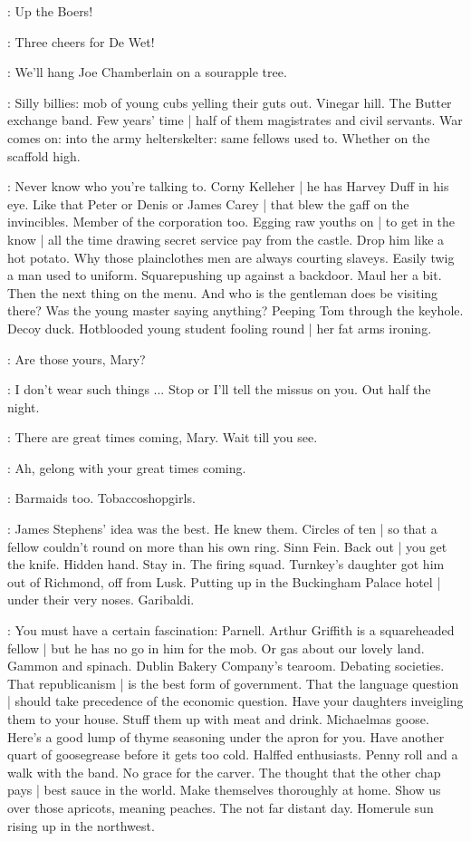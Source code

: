 :
Up the Boers!

:
Three cheers for De Wet!

:
We'll hang Joe Chamberlain on a sourapple tree.

\BloomInt:
Silly billies:
mob of young cubs yelling their guts out.
Vinegar hill.
The Butter exchange band.
Few years' time |
half of them magistrates and civil servants.
War comes on:
into the army helterskelter:
same fellows used to.
Whether on the scaffold high.

\BloomInt:
Never know who you're talking to.
Corny Kelleher |
he has Harvey Duff in his eye.
Like that Peter or Denis or James Carey |
that blew the gaff on the invincibles.
Member of the corporation too.
Egging raw youths on |
to get in the know |
all the time drawing secret service pay from the castle.
Drop him like a hot potato.
Why those plainclothes men are always courting slaveys.
Easily twig a man used to uniform.
Squarepushing up
against a backdoor.
Maul her a bit.
Then the next thing on the menu.
And who is the gentleman does be visiting there?
Was the young master saying anything?
Peeping Tom through the keyhole.
Decoy duck.
Hotblooded young student fooling round |
her fat arms ironing.

\policeman:
Are those yours,
Mary?

\mary:
I don't wear such things ...
Stop or I'll tell the missus on you.
Out half the night.

\policeman:
There are great times coming,
Mary.
Wait till you see.

\mary:
Ah,
gelong with your great times coming.

\BloomInt:
Barmaids too.
Tobaccoshopgirls.

\BloomInt:
James Stephens' idea was the best.
He knew them.
Circles of ten |
so that a fellow couldn't round on more than his own ring.
Sinn Fein.
Back out |
you get the knife.
Hidden hand.
Stay in.
The firing squad.
Turnkey's daughter got him out of Richmond,
off from Lusk.
Putting up in the Buckingham Palace hotel |
under their very noses.
Garibaldi.

\BloomInt:
You must have a certain fascination:
Parnell.
Arthur Griffith is a squareheaded fellow |
but he has no go in him for the mob.
Or gas about our lovely land.
Gammon and spinach.
Dublin Bakery Company's tearoom.
Debating societies.
That republicanism |
is the best form of government.
That the language question |
should take precedence of the economic question.
Have your daughters inveigling them to your house.
Stuff them up with meat and drink.
Michaelmas goose.
Here's a good lump of thyme seasoning under the apron for you.
Have another quart of goosegrease before it gets too cold.
Half\/fed enthusiasts.
Penny roll and a walk with the band.
No grace for the carver.
The thought that the other chap pays |
best sauce in the world.
Make themselves thoroughly at home.
Show us over those apricots,
meaning peaches.
The not far distant day.
Homerule sun rising up in the northwest.

